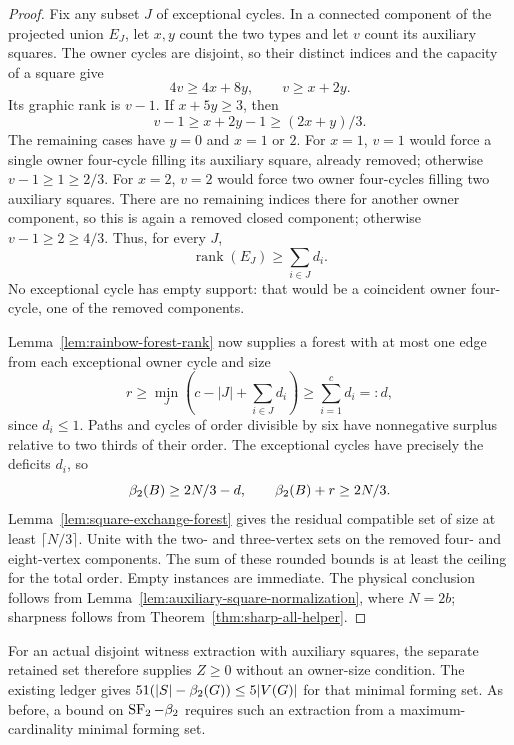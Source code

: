 \begin{proof}
Fix any subset $J$ of exceptional cycles. In a connected component of the
projected union $E_J$, let $x,y$ count the two types and let $v$ count its
auxiliary squares. The owner cycles are disjoint, so their distinct indices
and the capacity of a square give
\[
 4v\ge4x+8y,\qquad v\ge x+2y.
\]
Its graphic rank is $v-1$. If $x+5y\ge3$, then
\[
 v-1\ge x+2y-1\ge(2x+y)/3.
\]
The remaining cases have $y=0$ and $x=1$ or $2$. For $x=1$, $v=1$ would
force a single owner four-cycle filling its auxiliary square, already removed;
otherwise $v-1\ge1\ge2/3$. For $x=2$, $v=2$ would force two owner four-cycles
filling two auxiliary squares. There are no remaining indices there for
another owner component, so this is again a removed closed component;
otherwise $v-1\ge2\ge4/3$.
Thus, for every $J$,
\[
 \operatorname{rank}(E_J)\ge\sum_{i\in J}d_i.
\]
No exceptional cycle has empty support: that would be a coincident owner
four-cycle, one of the removed components.

Lemma~\ref{lem:rainbow-forest-rank} now supplies a forest with at most one
edge from each exceptional owner cycle and size
\[
 r\ge\min_J\left(c-|J|+\sum_{i\in J}d_i\right)
 \ge\sum_{i=1}^c d_i=:d,
\]
since $d_i\le1$. Paths and cycles of order divisible by six have nonnegative
surplus relative to two thirds of their order. The exceptional cycles have
precisely the deficits $d_i$, so
\[
 \beta_2(B)\ge2N/3-d,\qquad \beta_2(B)+r\ge2N/3.
\]
Lemma~\ref{lem:square-exchange-forest} gives the residual compatible set of
size at least $\lceil N/3\rceil$. Unite with the two- and three-vertex sets
on the removed four- and eight-vertex components. The sum of these rounded
bounds is at least the ceiling for the total order. Empty instances are
immediate. The physical conclusion follows from
Lemma~\ref{lem:auxiliary-square-normalization}, where $N=2b$; sharpness follows from
Theorem~\ref{thm:sharp-all-helper}.
\end{proof}

For an actual disjoint witness extraction with auxiliary squares, the separate
retained set therefore supplies $Z\ge0$ without an owner-size condition.
The existing ledger gives $51(|S|-\beta_2(G))\le5|V(G)|$ for that minimal
forming set. As before, a bound on $\operatorname{SF}_2-\beta_2$ requires such an extraction
from a maximum-cardinality minimal forming set.

